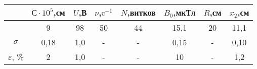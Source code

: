 \begin{tabular}{cccccccc}
\toprule
                 &$С\cdot10^5$,\;см&$U$,\;В&$\nu$,\;$\text{c}^{-1}$&$N$,\;витков&$B_0$,\;мкТл&$R$,\;см&$x_2$,\;см\\
\midrule
                 &9              &98   &50      &44        &15,1      &20    &11,1    \\
$\sigma$         &0,18           &1,0  &-       &-         &0,15      &-     &0,10    \\
$\varepsilon$, \%&2              &1,0  &-       &-         &10        &-     &1,2     \\
\bottomrule
\end{tabular}
